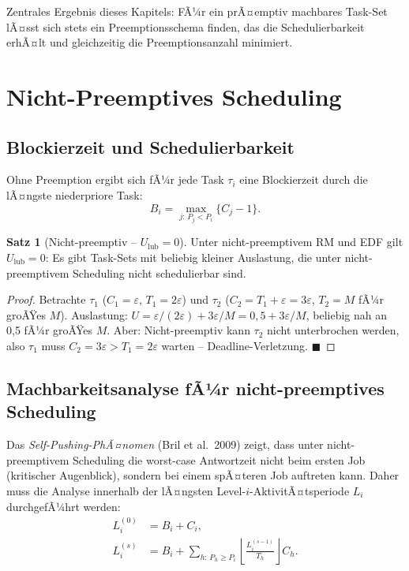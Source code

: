 ﻿\documentclass[a4paper,12pt]{report}
\theoremstyle{definition}
\newtheorem{satz}{Satz}[chapter]
\begin{document}
Zentrales Ergebnis dieses Kapitels: FÃ¼r ein prÃ¤emptiv machbares Task-Set lÃ¤sst sich
stets ein Preemptionsschema finden, das die Schedulierbarkeit erhÃ¤lt und gleichzeitig
die Preemptionsanzahl minimiert.

\section{Nicht-Preemptives Scheduling}

\subsection{Blockierzeit und Schedulierbarkeit}

Ohne Preemption ergibt sich fÃ¼r jede Task $\tau_i$ eine Blockierzeit durch die
lÃ¤ngste niederpriore Task:
\begin{equation}
	B_i = \max_{j:\,P_j < P_i}\{C_j - 1\}.
	\label{eq:np_blocking}
\end{equation}

\begin{satz}[Nicht-preemptiv -- $U_{\text{lub}} = 0$]
	Unter nicht-preemptivem RM und EDF gilt $U_{\text{lub}} = 0$: Es gibt Task-Sets
	mit beliebig kleiner Auslastung, die unter nicht-preemptivem Scheduling
	nicht schedulierbar sind.
\end{satz}

\begin{proof}
	Betrachte $\tau_1$ ($C_1 = \varepsilon$, $T_1 = 2\varepsilon$) und
	$\tau_2$ ($C_2 = T_1 + \varepsilon = 3\varepsilon$, $T_2 = M$ fÃ¼r groÃŸes $M$).
	Auslastung: $U = \varepsilon/(2\varepsilon) + 3\varepsilon/M = 0{,}5 + 3\varepsilon/M$,
	beliebig nah an 0{,}5 fÃ¼r groÃŸes $M$. Aber: Nicht-preemptiv kann $\tau_2$
	nicht unterbrochen werden, also $\tau_1$ muss $C_2 = 3\varepsilon > T_1 = 2\varepsilon$
	warten -- Deadline-Verletzung. \hfill$\blacksquare$
\end{proof}

\subsection{Machbarkeitsanalyse fÃ¼r nicht-preemptives Scheduling}

Das \emph{Self-Pushing-PhÃ¤nomen} (Bril et al.\ 2009) zeigt, dass unter
nicht-preemptivem Scheduling die worst-case Antwortzeit nicht beim ersten Job
(kritischer Augenblick), sondern bei einem spÃ¤teren Job auftreten kann. Daher
muss die Analyse innerhalb der lÃ¤ngsten Level-$i$-AktivitÃ¤tsperiode $L_i$
durchgefÃ¼hrt werden:
\begin{align}
	L_i^{(0)} &= B_i + C_i, \nonumber\\
	L_i^{(s)} &= B_i + \sum_{h:\,P_h \geq P_i} \left\lfloor \frac{L_i^{(s-1)}}{T_h} \right\rfloor C_h.
	\label{eq:level_i_period}
\end{align}
\end{document}
